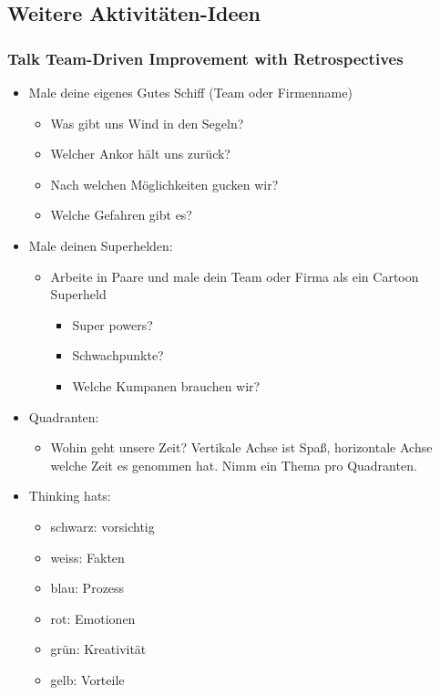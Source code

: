 \subsection{Weitere Aktivitäten-Ideen}


\subsubsection{Talk Team-Driven Improvement with Retrospectives}
\begin{itemize}
  \item Male deine eigenes Gutes Schiff (Team oder Firmenname)
    \begin{itemize}
      \item Was gibt uns Wind in den Segeln?
      \item Welcher Ankor hält uns zurück?
      \item Nach welchen Möglichkeiten gucken wir?
      \item Welche Gefahren gibt es?
    \end{itemize}
  \item Male deinen Superhelden:
    \begin{itemize}
      \item Arbeite in Paare und male dein Team oder Firma als ein Cartoon Superheld
        \begin{itemize}
          \item Super powers?
          \item Schwachpunkte?
          \item Welche Kumpanen brauchen wir?
        \end{itemize}
    \end{itemize}
  \item Quadranten:
    \begin{itemize}
      \item Wohin geht unsere Zeit? Vertikale Achse ist Spaß, horizontale Achse welche Zeit es
        genommen hat. Nimm ein Thema pro Quadranten.
    \end{itemize}
  \item Thinking hats:
    \begin{itemize}
      \item schwarz: vorsichtig
      \item weiss: Fakten
      \item blau: Prozess
      \item rot: Emotionen
      \item grün: Kreativität
      \item gelb: Vorteile

\end{itemize}
\end{itemize}
